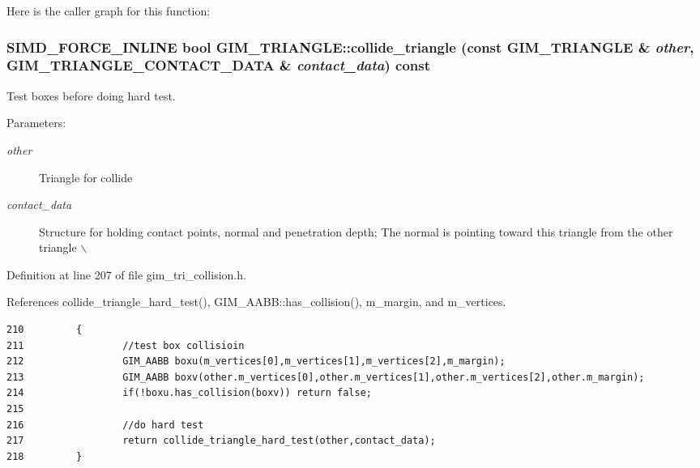 Here is the caller graph for this function:\hypertarget{class_g_i_m___t_r_i_a_n_g_l_e_42749c17088408842a97534559b9d1f2}{
\subsubsection[collide\_\-triangle]{\setlength{\rightskip}{0pt plus 5cm}SIMD\_\-FORCE\_\-INLINE bool GIM\_\-TRIANGLE::collide\_\-triangle (const {\bf GIM\_\-TRIANGLE} \& {\em other}, \/  {\bf GIM\_\-TRIANGLE\_\-CONTACT\_\-DATA} \& {\em contact\_\-data}) const}}
\label{class_g_i_m___t_r_i_a_n_g_l_e_42749c17088408842a97534559b9d1f2}


Test boxes before doing hard test. 

\begin{Desc}
\item[Parameters:]
\begin{description}
\item[{\em other}]Triangle for collide \item[{\em contact\_\-data}]Structure for holding contact points, normal and penetration depth; The normal is pointing toward this triangle from the other triangle $\backslash$ \end{description}
\end{Desc}


Definition at line 207 of file gim\_\-tri\_\-collision.h.

References collide\_\-triangle\_\-hard\_\-test(), GIM\_\-AABB::has\_\-collision(), m\_\-margin, and m\_\-vertices.

\begin{Code}\begin{verbatim}210         {
211                 //test box collisioin
212                 GIM_AABB boxu(m_vertices[0],m_vertices[1],m_vertices[2],m_margin);
213                 GIM_AABB boxv(other.m_vertices[0],other.m_vertices[1],other.m_vertices[2],other.m_margin);
214                 if(!boxu.has_collision(boxv)) return false;
215 
216                 //do hard test
217                 return collide_triangle_hard_test(other,contact_data);
218         }
\end{verbatim}
\end{Code}




